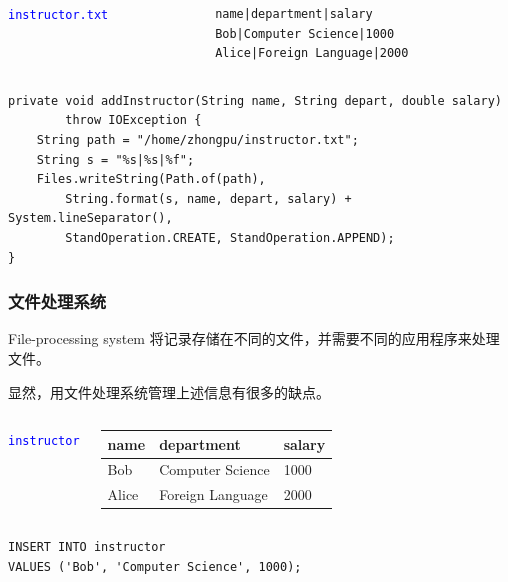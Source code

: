 \documentclass[aspectratio=169, 14pt]{beamer}
\begin{document}
\begin{frame}[fragile]

    \begin{columns}
        {\large \textcolor{blue}{\texttt{instructor.txt}}}
        \begin{verbatim}
            name|department|salary
            Bob|Computer Science|1000
            Alice|Foreign Language|2000        
         \end{verbatim}
    \end{columns}
\pause
    \begin{verbatim}
private void addInstructor(String name, String depart, double salary)    
        throw IOException {
    String path = "/home/zhongpu/instructor.txt";
    String s = "%s|%s|%f";
    Files.writeString(Path.of(path),
        String.format(s, name, depart, salary) + System.lineSeparator(),
        StandOperation.CREATE, StandOperation.APPEND); 
}
    \end{verbatim}
  
\end{frame}

\begin{frame}
    \frametitle{文件处理系统}

    \begin{block}{File-processing system}
        将记录存储在不同的文件，并需要不同的应用程序来处理文件。        
    \end{block}
    显然，用文件处理系统管理上述信息有很多的缺点。
\end{frame}

\begin{frame}[fragile]

    \begin{columns}
        {\large \textcolor{blue}{\texttt{instructor}}}

\begin{table}
    \begin{tabular}{lll}
      \toprule
      name & department & salary \\
      \midrule
      Bob & Computer Science & 1000 \\
      Alice & Foreign Language & 2000 \\
      \bottomrule
    \end{tabular}
\end{table}
    \end{columns}
\begin{verbatim}
INSERT INTO instructor
VALUES ('Bob', 'Computer Science', 1000);
\end{verbatim}
\end{frame}
\end{document}
